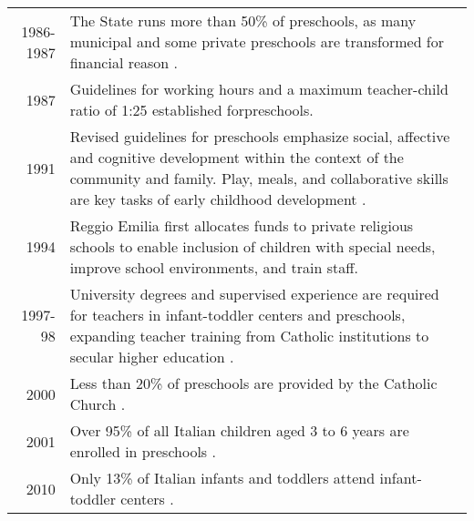 \begin{tabular}{r L{45em}}
  1986-1987 & The State runs more than 50\% of preschools, as many municipal and some private preschools are transformed for financial reason \citep{Del-Boca-etal_2016_CESifo-ES}. \\
  1987 & Guidelines for working hours and a maximum teacher-child ratio of 1:25 established forpreschools. \\
  1991 & Revised guidelines for preschools emphasize social, affective and cognitive development within the context of the community and family. Play, meals, and collaborative skills are key tasks of early childhood development \citep{Corsaro_1996_Early-Edu}. \\
  1994 & Reggio Emilia first allocates funds to private religious schools to enable inclusion of children with special needs, improve school environments, and train staff. \\
  1997-98 & University degrees and supervised experience are required for teachers in infant-toddler centers and preschools, expanding teacher training from Catholic institutions to secular higher education \citep{Ghedini_2001_Ital-Natl-Policy}.  \\
  2000 & Less than 20\% of preschools are provided by the Catholic Church \citep{Hohnerlein_2009_Paradox-Public-Preschools}.  \\
  2001 & Over 95\% of all Italian children aged 3 to 6 years are enrolled in preschools \citep{OECD_2001_Italy-Country-Note}. \\
  2010 & Only 13\% of Italian infants and toddlers attend infant-toddler centers \citep{Del-Boca-etal_2016_CESifo-ES}. \\
\bottomrule
\end{tabular}

